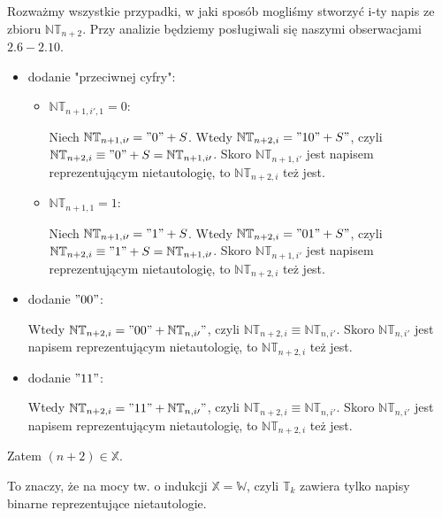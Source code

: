 \noindent
Rozważmy wszystkie przypadki, w jaki sposób mogliśmy stworzyć i-ty napis ze zbioru $\mathbb{NT}_{n + 2}$. Przy analizie będziemy posługiwali się naszymi obserwacjami $2.6 - 2.10$.
\begin{itemize}
	\item dodanie "przeciwnej cyfry":
	\begin{itemize}
		\item $\mathbb{NT}_{n + 1, i\prime, 1} = 0$:

		Niech $\mathbb{NT}_{n + 1, i\prime} = "0" + S$. Wtedy $\mathbb{NT}_{n + 2, i} = "10" + S"$, czyli $\mathbb{NT}_{n + 2, i} \equiv "0" + S = \mathbb{NT}_{n + 1, i\prime}$. Skoro $\mathbb{NT}_{n + 1, i\prime}$ jest napisem reprezentującym nietautologię, to $\mathbb{NT}_{n + 2, i}$ też jest.

		\item $\mathbb{NT}_{n + 1, 1} = 1$:

		Niech $\mathbb{NT}_{n + 1, i\prime} = "1" + S$. Wtedy $\mathbb{NT}_{n + 2, i} = "01" + S"$, czyli $\mathbb{NT}_{n + 2, i} \equiv "1" + S = \mathbb{NT}_{n + 1, i\prime}$. Skoro $\mathbb{NT}_{n + 1, i\prime}$ jest napisem reprezentującym nietautologię, to $\mathbb{NT}_{n + 2, i}$ też jest.
	\end{itemize}
	\item dodanie $"00"$:

	Wtedy $\mathbb{NT}_{n + 2, i} = "00" + \mathbb{NT}_{n, i\prime}"$, czyli $\mathbb{NT}_{n + 2, i} \equiv \mathbb{NT}_{n, i\prime}$. Skoro $\mathbb{NT}_{n, i\prime}$ jest napisem reprezentującym nietautologię, to $\mathbb{NT}_{n + 2, i}$ też jest.
	\item dodanie $"11"$:

	Wtedy $\mathbb{NT}_{n + 2, i} = "11" + \mathbb{NT}_{n, i\prime}"$, czyli $\mathbb{NT}_{n + 2, i} \equiv \mathbb{NT}_{n, i\prime}$. Skoro $\mathbb{NT}_{n, i\prime}$ jest napisem reprezentującym nietautologię, to $\mathbb{NT}_{n + 2, i}$ też jest.
\end{itemize}

Zatem $(n + 2) \in \mathbb{X}$.
\n

\noindent
To znaczy, że na mocy tw. o indukcji $\mathbb{X} = \mathbb{W}$, czyli $\mathbb{T}_k$ zawiera tylko napisy binarne reprezentujące nietautologie.